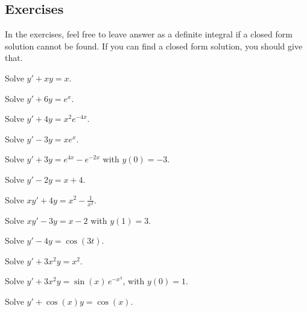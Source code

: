 \subsection{Exercises}

In the exercises, feel free to leave answer as a definite integral if a
closed form solution cannot be found.  If you can find a closed form
solution, you should give that.

\begin{exercise}
Solve $y' + xy = x$.
\end{exercise}

\begin{exercise}
Solve $y' + 6y = e^x$.
\end{exercise}

\begin{exercise}
Solve $y' + 4y = x^2e^{-4x}$.
\end{exercise}

\begin{exercise}
Solve $y' - 3y = xe^x$.
\end{exercise}

\begin{exercise}
Solve $y' + 3y = e^{4x} - e^{-2x}$ with $y(0) = -3$.
\end{exercise}

\begin{exercise}
Solve $y' - 2y = x + 4$.
\end{exercise}

\begin{exercise}
Solve $xy' + 4y = x^2 - \frac{1}{x^2}$.
\end{exercise}

\begin{exercise}
Solve $xy' - 3y = x-2$ with $y(1) = 3$. 
\end{exercise}

\begin{exercise}
Solve $y' - 4y = \cos{(3t)}$.
\end{exercise}

\begin{exercise}\ansMark%
Solve $y'+3 x^2 y = x^2$.
\end{exercise}

\begin{exercise}
Solve $y' + 3x^2y = \sin(x) \, e^{-x^3}$, with $y(0) = 1$.
\end{exercise}

\begin{exercise}
Solve $y' + \cos (x) y = \cos(x)$.
\end{exercise}

